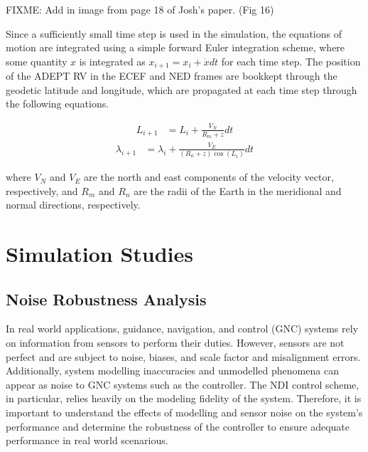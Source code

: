 \documentclass[12pt]{article}
\numberwithin{equation}{section}
\numberwithin{figure}{section}
\numberwithin{table}{section}
\begin{document}
FIXME: Add in image from page 18 of Josh's paper. (Fig 16)

Since a sufficiently small time step is used in the simulation, the equations of motion are integrated using a simple forward Euler integration scheme, where some quantity $x$ is integrated as $x_{i+1} = x_i + \dot{x}dt$ for each time step. The position of the ADEPT RV in the ECEF and NED frames are bookkept through the geodetic latitude and longitude, which are propagated at each time step through the following equations.

\begin{align}
L_{i+1} &= L_i + \frac{V_{N}}{R_m + z} dt
\end{align}
\begin{align}
\lambda_{i+1} &= \lambda_i + \frac{V_{E}}{(R_n + z)\cos(L_i)} dt
\end{align}

where $V_N$ and $V_E$ are the north and east components of the velocity vector, respectively, and $R_m$ and $R_n$ are the radii of the Earth in the meridional and normal directions, respectively.

\section{Simulation Studies}
\subsection{Noise Robustness Analysis}
In real world applications, guidance, navigation, and control (GNC) systems rely on information from sensors to perform their duties. However, sensors are not perfect and are subject to noise, biases, and scale factor and misalignment errors. Additionally, system modelling inaccuracies and unmodelled phenomena can appear as noise to GNC systems such as the controller. The NDI control scheme, in particular, relies heavily on the modeling fidelity of the system. Therefore, it is important to understand the effects of modelling and sensor noise on the system's performance and determine the robustness of the controller to ensure adequate performance in real world scenarious.
\end{document}
